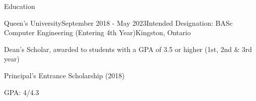 \documentclass{resume} %
\begin{document}

\begin{rSection}{Education}

\begin{rSubsection}{Queen's University}{September 2018 - May 2023}{Intended
    Designation: BASc Computer Engineering (Entering 4th Year)}{Kingston, Ontario}
\item Dean's Scholar, awarded to students with a GPA of 3.5 or higher (1st, 
  2nd \& 3rd year)
\item Principal's Entrance Scholarship (2018)
\item GPA: 4/4.3
\end{rSubsection}
\end{rSection}

\end{document}
